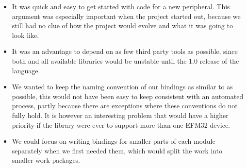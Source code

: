 \begin{itemize}
    \item It was quick and easy to get started with code for a new peripheral.
    This argument was especially important when the project started out, because we still had no clue of how the project would evolve and what it was going to look like.

    \item It was an advantage to depend on as few third party tools as possible, since both {\rust} and all available libraries would be unstable until the 1.0 release of the language.

    \item We wanted to keep the naming convention of our bindings as similar to \emlib as possible, this would not have been easy to keep consistent with an automated process, partly because there are exceptions where these conventions do not fully hold.
    It is however an interesting problem that would have a higher priority if the library were ever to support more than one EFM32 device.

    \item We could focus on writing bindings for smaller parts of each module separately when we first needed them, which would split the work into smaller work-packages.
\end{itemize}
